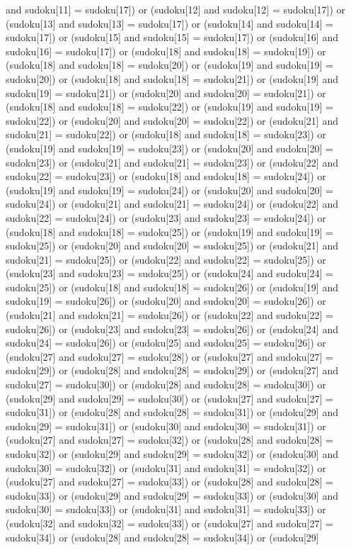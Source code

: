 \documentclass[8pt]{article}
\begin{document}
\begin{algorithm}[H]
and sudoku[11] = sudoku[17]) or (sudoku[12]  and sudoku[12] = sudoku[17]) or (sudoku[13]  and sudoku[13] = sudoku[17]) or (sudoku[14]  and sudoku[14] = sudoku[17]) or (sudoku[15]  and sudoku[15] = sudoku[17]) or (sudoku[16]  and sudoku[16] = sudoku[17]) or (sudoku[18]  and sudoku[18] = sudoku[19]) or (sudoku[18]  and sudoku[18] = sudoku[20]) or (sudoku[19]  and sudoku[19] = sudoku[20]) or (sudoku[18]  and sudoku[18] = sudoku[21]) or (sudoku[19]  and sudoku[19] = sudoku[21]) or (sudoku[20]  and sudoku[20] = sudoku[21]) or (sudoku[18]  and sudoku[18] = sudoku[22]) or (sudoku[19]  and sudoku[19] = sudoku[22]) or (sudoku[20]  and sudoku[20] = sudoku[22]) or (sudoku[21]  and sudoku[21] = sudoku[22]) or (sudoku[18]  and sudoku[18] = sudoku[23]) or (sudoku[19]  and sudoku[19] = sudoku[23]) or (sudoku[20]  and sudoku[20] = sudoku[23]) or (sudoku[21]  and sudoku[21] = sudoku[23]) or (sudoku[22]  and sudoku[22] = sudoku[23]) or (sudoku[18]  and sudoku[18] = sudoku[24]) or (sudoku[19]  and sudoku[19] = sudoku[24]) or (sudoku[20]  and sudoku[20] = sudoku[24]) or (sudoku[21]  and sudoku[21] = sudoku[24]) or (sudoku[22]  and sudoku[22] = sudoku[24]) or (sudoku[23]  and sudoku[23] = sudoku[24]) or (sudoku[18]  and sudoku[18] = sudoku[25]) or (sudoku[19]  and sudoku[19] = sudoku[25]) or (sudoku[20]  and sudoku[20] = sudoku[25]) or (sudoku[21]  and sudoku[21] = sudoku[25]) or (sudoku[22]  and sudoku[22] = sudoku[25]) or (sudoku[23]  and sudoku[23] = sudoku[25]) or (sudoku[24]  and sudoku[24] = sudoku[25]) or (sudoku[18]  and sudoku[18] = sudoku[26]) or (sudoku[19]  and sudoku[19] = sudoku[26]) or (sudoku[20]  and sudoku[20] = sudoku[26]) or (sudoku[21]  and sudoku[21] = sudoku[26]) or (sudoku[22]  and sudoku[22] = sudoku[26]) or (sudoku[23]  and sudoku[23] = sudoku[26]) or (sudoku[24]  and sudoku[24] = sudoku[26]) or (sudoku[25]  and sudoku[25] = sudoku[26]) or (sudoku[27]  and sudoku[27] = sudoku[28]) or (sudoku[27]  and sudoku[27] = sudoku[29]) or (sudoku[28]  and sudoku[28] = sudoku[29]) or (sudoku[27]  and sudoku[27] = sudoku[30]) or (sudoku[28]  and sudoku[28] = sudoku[30]) or (sudoku[29]  and sudoku[29] = sudoku[30]) or (sudoku[27]  and sudoku[27] = sudoku[31]) or (sudoku[28]  and sudoku[28] = sudoku[31]) or (sudoku[29]  and sudoku[29] = sudoku[31]) or (sudoku[30]  and sudoku[30] = sudoku[31]) or (sudoku[27]  and sudoku[27] = sudoku[32]) or (sudoku[28]  and sudoku[28] = sudoku[32]) or (sudoku[29]  and sudoku[29] = sudoku[32]) or (sudoku[30]  and sudoku[30] = sudoku[32]) or (sudoku[31]  and sudoku[31] = sudoku[32]) or (sudoku[27]  and sudoku[27] = sudoku[33]) or (sudoku[28]  and sudoku[28] = sudoku[33]) or (sudoku[29]  and sudoku[29] = sudoku[33]) or (sudoku[30]  and sudoku[30] = sudoku[33]) or (sudoku[31]  and sudoku[31] = sudoku[33]) or (sudoku[32]  and sudoku[32] = sudoku[33]) or (sudoku[27]  and sudoku[27] = sudoku[34]) or (sudoku[28]  and sudoku[28] = sudoku[34]) or (sudoku[29]  
\end{algorithm}
\end{document}
